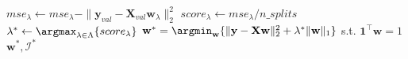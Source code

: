 \begin{algorithm}[H]
\begin{algorithmic}[1]
            \Comment{\scalebox{0.9}{\textcolor{Grey_color}{Solve $\ell_1$-program}}}
            \State $mse_{\lambda} \gets mse_{\lambda} - \|\mathbf{y}_{val} - \mathbf{X}_{val}\mathbf{w}_{\lambda}\|_2^2$
            \Comment{\scalebox{0.9}{\textcolor{Grey_color}{Accumulate negative MSE for scoring}}}
        \EndFor
        \State $score_{\lambda} \gets mse_{\lambda}/n\_splits$ \Comment{\scalebox{0.9}{\textcolor{Grey_color}{Average neg. MSE}}}
    \EndFor
    \State $\lambda^* \gets \argmax_{\lambda \in \Lambda} \{score_{\lambda}\}$
    \State $\mathbf{w}^* = \argmin_{\mathbf{w}} \{\|\mathbf{y} - \mathbf{X}\mathbf{w}\|_2^2 + \lambda^*\|\mathbf{w}\|_1\}$ s.t. $\mathbf{1}^\top \mathbf{w} = 1$
    \State \Return $\mathbf{w}^*, \mathcal{I}^*$
\EndFunction
\end{algorithmic}
\end{algorithm}
